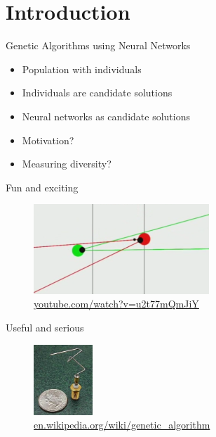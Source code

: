 
\section{Introduction}

\begin{frame}{Genetic Algorithms using Neural Networks}

  \begin{itemize}
    \item Population with individuals
    \item Individuals are candidate solutions
    \item Neural networks as candidate solutions
  \end{itemize}
  \begin{itemize}
    \item Motivation?
    \item Measuring diversity?
  \end{itemize}
\end{frame}

\begin{frame}{Fun and exciting}
  \begin{figure}
    \centering
    \includegraphics[width=250px]{elias/images/sniper.png}
    \caption{\url{youtube.com/watch?v=u2t77mQmJiY}}
  \end{figure}
\end{frame}


\begin{frame}{Useful and serious}
  \begin{figure}
    \centering
    \includegraphics[height=100px]{elias/images/antenna.jpg}
    \caption{\url{en.wikipedia.org/wiki/genetic_algorithm}}
  \end{figure}
\end{frame}

